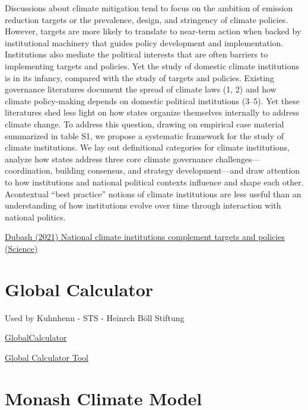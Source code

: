 \documentclass[
]{book}
\begin{document}
Discussions about climate mitigation tend to focus on the ambition of emission reduction targets or the prevalence, design, and stringency of climate policies. However, targets are more likely to translate to near-term action when backed by institutional machinery that guides policy development and implementation. Institutions also mediate the political interests that are often barriers to implementing targets and policies. Yet the study of domestic climate institutions is in its infancy, compared with the study of targets and policies. Existing governance literatures document the spread of climate laws (1, 2) and how climate policy-making depends on domestic political institutions (3--5). Yet these literatures shed less light on how states organize themselves internally to address climate change. To address this question, drawing on empirical case material summarized in table S1, we propose a systematic framework for the study of climate institutions. We lay out definitional categories for climate institutions, analyze how states address three core climate governance challenges---coordination, building consensus, and strategy development---and draw attention to how institutions and national political contexts influence and shape each other. Acontextual ``best practice'' notions of climate institutions are less useful than an understanding of how institutions evolve over time through interaction with national politics.

\href{https://www.science.org/doi/10.1126/science.abm1157}{Dubash (2021) National climate institutions complement targets and policies (Science)}

\hypertarget{global-calculator}{%
\section{Global Calculator}\label{global-calculator}}

Used by Kuhnhenn - STS - Heinrch Böll Stiftung

\href{http://www.globalcalculator.org/}{GlobalCalculator}

\href{http://tool.globalcalculator.org/globcalc.html?levers=22rfoe2e\%2013be1111c2c2c1n31hfjdcef222hp233f211111fn2211111111/dashboard/en}{Global Calculator Tool}

\hypertarget{monash-climate-model}{%
\section{Monash Climate Model}\label{monash-climate-model}}
\end{document}
